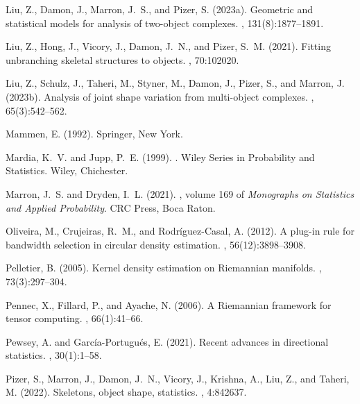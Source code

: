 \documentclass[oneside,11pt]{article}
\begin{document}
\begin{thebibliography}{}
	Liu, Z., Damon, J., Marron, J.~S., and Pizer, S. (2023a).
	\newblock Geometric and statistical models for analysis of two-object
	complexes.
	, 131(8):1877--1891.

	Liu, Z., Hong, J., Vicory, J., Damon, J.~N., and Pizer, S.~M. (2021).
	\newblock Fitting unbranching skeletal structures to objects.
	, 70:102020.

	Liu, Z., Schulz, J., Taheri, M., Styner, M., Damon, J., Pizer, S., and Marron,
	J. (2023b).
	\newblock Analysis of joint shape variation from multi-object complexes.
	, 65(3):542--562.

	Mammen, E. (1992).
	\newblock Springer, New York.

	Mardia, K.~V. and Jupp, P.~E. (1999).
	.
	\newblock Wiley Series in Probability and Statistics. Wiley, Chichester.

	Marron, J.~S. and Dryden, I.~L. (2021).
	, volume 169 of {\em Monographs on
		Statistics and Applied Probability}.
	\newblock CRC Press, Boca Raton.

	Oliveira, M., Crujeiras, R.~M., and Rodr\'iguez-Casal, A. (2012).
	\newblock A plug-in rule for bandwidth selection in circular density
	estimation.
	, 56(12):3898--3908.

	Pelletier, B. (2005).
	\newblock Kernel density estimation on {R}iemannian manifolds.
	, 73(3):297--304.

	Pennec, X., Fillard, P., and Ayache, N. (2006).
	\newblock A {R}iemannian framework for tensor computing.
	, 66(1):41--66.

	Pewsey, A. and Garc\'ia-Portugu\'es, E. (2021).
	\newblock Recent advances in directional statistics.
	, 30(1):1--58.

	Pizer, S., Marron, J., Damon, J.~N., Vicory, J., Krishna, A., Liu, Z., and
	Taheri, M. (2022).
	\newblock Skeletons, object shape, statistics.
	, 4:842637.


\end{thebibliography}
\end{document}
